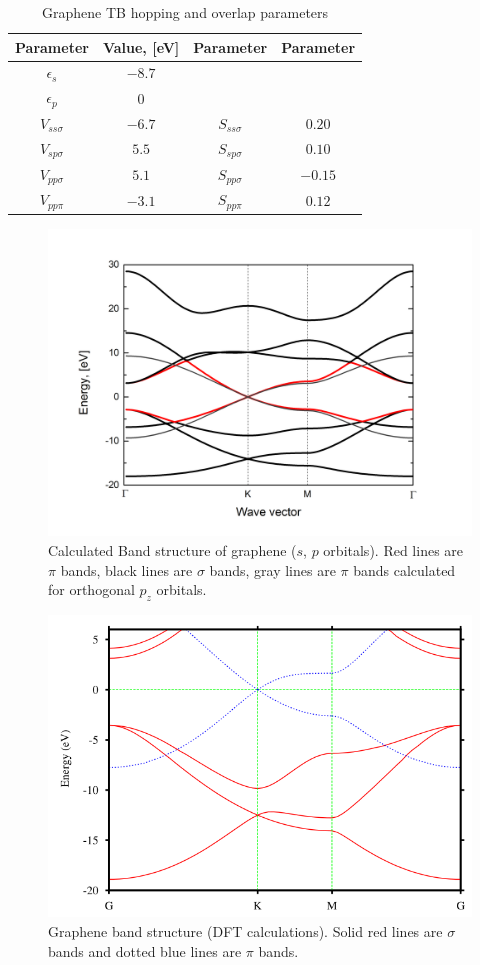 \begin{table}[h]
\begin{center}
\begin{tabular}{|c |c |c| c|}
\hline
Parameter&Value, [eV]&Parameter&Parameter\\ \hline
$\epsilon_s$ &$- 8.7$ & &\\ \hline
$\epsilon_p$&$0$ & &\\ \hline
$V_{ss\sigma}$&$- 6.7$ & $S_{ss\sigma}$&$0.20$\\ \hline
$V_{sp\sigma} $&$5.5$ & $S_{sp\sigma}$&$0.10$\\  \hline
$V_{pp\sigma}$&$5.1$ & $S_{pp\sigma}$&$- 0.15$\\ \hline
$V_{pp\pi}$&$- 3.1$ & $S_{pp\pi}$&$0.12$ \\ \hline  
\end{tabular}
\end{center}
\caption{Graphene TB hopping and overlap parameters \cite{basics}}
\label{tab:graphene_overlap_parameters}
\end{table}

\begin{figure}[h!] 
\begin{center}
  \includegraphics[width=0.65\linewidth]{img/graphene_sp}
  \caption{Calculated Band structure of graphene ($s$, $p$ orbitals). Red lines are $\pi$ bands, black lines are $\sigma$ bands, gray lines are $\pi$ bands calculated for orthogonal $p_z$ orbitals. \label{fig:graphene_sp}}
\end{center}
\end{figure}

\begin{figure}[h!] 
\begin{center}
  \includegraphics[width=0.55\linewidth]{img/graphene_dft}
  \caption{Graphene band structure (DFT calculations). Solid red lines are $\sigma$ bands and dotted blue lines are $\pi$ bands. \cite{boukhvalov} \label{fig:graphene_dft}}
\end{center}
\end{figure}

